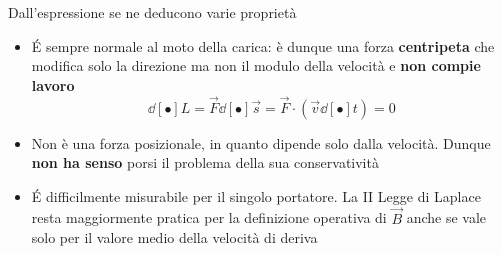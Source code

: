 
Dall'espressione se ne deducono varie proprietà

\begin{itemize}
\item \'E sempre normale al moto della carica: è dunque una forza \textbf{centripeta} che modifica solo la direzione ma non il modulo della velocità e \textbf{non compie lavoro}
\[\dd[•]{L} = \vec{F} \dd[•]{\vec{s}} = \vec{F} \cdot (\vec{v} \dd[•]{t}) = 0\]
\item Non è una forza posizionale, in quanto dipende solo dalla velocità. Dunque \textbf{non ha senso} porsi il problema della sua conservatività
\item \'E difficilmente misurabile per il singolo portatore. La II Legge di Laplace resta maggiormente pratica per la definizione operativa di $\vec{B}$ anche se vale solo per il valore medio della velocità di deriva
\end{itemize}

